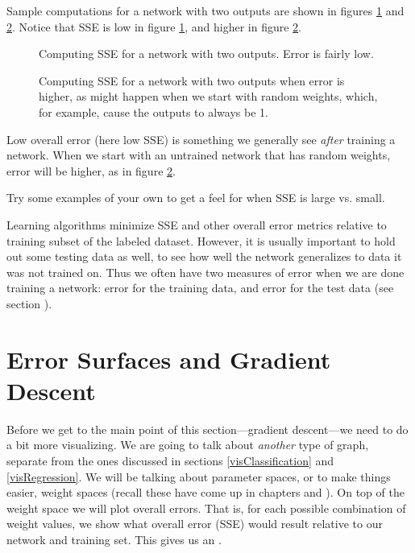 Sample computations for a network with two outputs are shown in figures \ref{error_computation2_low} and \ref{error_computation2_high}.  Notice that SSE is low in figure \ref{error_computation2_low}, and higher in figure \ref{error_computation2_high}.

\begin{figure}[h]
\centering
{}
\caption[Jeff Yoshimi.]{Computing SSE for a network with two outputs. Error is fairly low.}
\label{error_computation2_low}
\end{figure}

\begin{figure}[h]
\centering
{}
\caption[Jeff Yoshimi.]{Computing SSE for a network with two outputs when error is higher, as might happen when we start with random weights, which, for example, cause the outputs to always be 1.}
\label{error_computation2_high}
\end{figure}

Low overall error (here low SSE) is something we generally see \emph{after} training a  network. When we start with an untrained network that has random weights, error will be higher, as in figure \ref{error_computation2_high}.

Try some examples of your own to get a feel for when SSE is large vs. small.

Learning algorithms minimize SSE and other overall error metrics relative to training subset of the labeled dataset. However, it is usually important to hold out some testing data as well, to see how well the network generalizes to data it was not trained on. Thus we often have two measures of error when we are done training a network: error for the training data, and error for the test data (see section ).

\section{Error Surfaces and Gradient Descent}\label{sect_gradient_descent}

Before we get to the main point of this section---gradient descent---we need to do a bit more visualizing. We are going to talk about \emph{another} type of graph, separate from the ones discussed in sections \ref{visClassification} and \ref{visRegression}. We will be talking about parameter spaces, or to make things easier, weight spaces (recall these have come up in chapters  and ). On top of the weight space we will plot overall errors. That is, for each possible combination of weight values, we show what overall error (\eg SSE) would result relative to our network and training set. This  gives us an .

